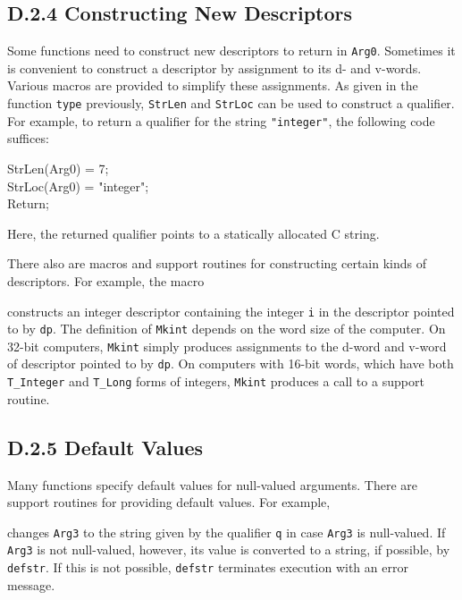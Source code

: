 \subsection[D.2.4 Constructing New Descriptors]{D.2.4 Constructing New Descriptors}

Some functions need to construct new descriptors to return in \texttt{Arg0}.
Sometimes it is convenient to construct a descriptor by assignment to its d- and
v-words. Various macros are provided to simplify these assignments. As given in
the function \texttt{type} previously, \texttt{StrLen} and \texttt{StrLoc} can
be used to construct a qualifier. For example, to return a qualifier for the
string \texttt{"integer"}, the following code suffices:
\goodbreak
\begin{iconcode}
StrLen(Arg0) = 7;\\
StrLoc(Arg0) = "integer";\\
Return;
\end{iconcode}
\noindent
Here, the returned qualifier points to a statically allocated C string.

There also are macros and support routines for constructing certain
kinds of descriptors. For example, the macro


\noindent
constructs an integer descriptor containing the integer \texttt{i} in the
descriptor pointed to by \texttt{dp}. The definition of \texttt{\color{red}Mkint}
depends on the word size of the computer. On 32-bit computers,
\texttt{\color{red}Mkint} simply produces assignments to the d-word and v-word of
descriptor pointed to by \texttt{dp}. On computers with 16-bit words, which
have both \texttt{T\_Integer} and \texttt{T\_Long} forms of integers,
\texttt{\color{red}Mkint} produces a call to a support routine.

\subsection[D.2.5 Default Values]{D.2.5 Default Values}

Many functions specify default values for null-valued arguments. There
are support routines for providing default values. For example,



\noindent
changes \texttt{Arg3} to the string given by the qualifier \texttt{q} in
case \texttt{Arg3} is null-valued. If \texttt{Arg3} is not null-valued,
however, its value is converted to a string, if possible, by
\texttt{\color{red}defstr}. If this is not possible, \texttt{\color{red}defstr} terminates
execution with an error message.

